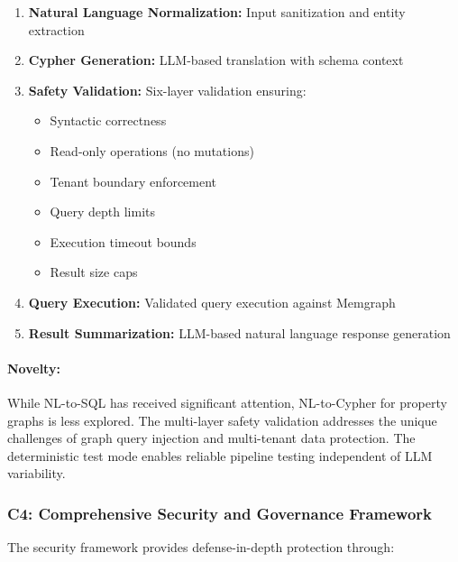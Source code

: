 \documentclass[a4paper,twoside]{sapthesis}
\begin{document}
\begin{enumerate}
    \item \textbf{Natural Language Normalization:} Input sanitization and entity extraction
    \item \textbf{Cypher Generation:} LLM-based translation with schema context
    \item \textbf{Safety Validation:} Six-layer validation ensuring:
    \begin{itemize}
        \item Syntactic correctness
        \item Read-only operations (no mutations)
        \item Tenant boundary enforcement
        \item Query depth limits
        \item Execution timeout bounds
        \item Result size caps
    \end{itemize}
    \item \textbf{Query Execution:} Validated query execution against Memgraph
    \item \textbf{Result Summarization:} LLM-based natural language response generation
\end{enumerate}

\paragraph{Novelty:} While NL-to-SQL has received significant attention, NL-to-Cypher for property graphs is less explored. The multi-layer safety validation addresses the unique challenges of graph query injection and multi-tenant data protection. The deterministic test mode enables reliable pipeline testing independent of LLM variability.

\subsubsection{C4: Comprehensive Security and Governance Framework}

The security framework provides defense-in-depth protection through:
\end{document}

